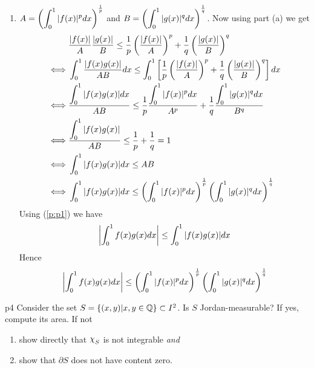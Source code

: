 \documentclass[a4paper, 11pt]{article}
\begin{document}
{\begin{enumerate}[label=(\alph*)]
\begin{align*}
	\end{align*}\Qed
	\item $A=\left(\displaystyle{\int_0^1|f(x)|^pdx}\right)^{\frac1p}$ and $B=\left(\displaystyle{\int_0^1|g(x)|^qdx}\right)^{\frac1q}$. Now using part (a) we get
	\begin{align*}
		     & \frac{|f(x)|}{A}\frac{ |g(x)| }{B}\leq \frac1p\left(\frac{ |f(x)| }{A}\right)^p+\frac1q\left(\frac{ |g(x)| }{B}\right)^q                         \\
		\iff & \int_0^1\frac{ |f(x)g(x)| }{AB}dx\leq \int_0^1\left[\frac1p\left(\frac{ |f(x)| }{A}\right)^p+\frac1q\left(\frac{ |g(x)| }{B}\right)^q\right]dx        \\
		\iff & \frac{ \displaystyle{\int_0^1|f(x)g(x)|} dx}{AB}\leq \frac1p\frac{\displaystyle{\int_0^1 |f(x)|^p dx}}{A^p}+\frac1q\frac{\displaystyle{\int_0^1 |g(x)|^qdx}}{B^q} \\
		\iff & \frac{ \displaystyle{\int_0^1|f(x)g(x)|} }{AB}\leq \frac1p+\frac1q=1                                                                            \\
		\iff & \int_0^1|f(x)g(x)|dx \leq AB                                                                                                           \\
		\iff & \int_0^1|f(x)g(x)|dx \leq  \left(\displaystyle{\int_0^1|f(x)|^pdx}\right)^{\frac1p}\left(\displaystyle{\int_0^1|g(x)|^qdx}\right)^{\frac1q}
	\end{align*}Using (\ref{p:p1}) we have $$\left|\int_0^1f(x)g(x)dx \right|\leq \int_0^1|f(x)g(x)|dx $$Hence $$\left|\int_0^1f(x)g(x)dx \right|\leq \left(\displaystyle{\int_0^1|f(x)|^pdx}\right)^{\frac1p}\left(\displaystyle{\int_0^1|g(x)|^qdx}\right)^{\frac1q}$$
	\end{enumerate}
}



\begin{problem}{%
}{p4%
}
Consider the set $S=\{(x,y)|x,y \in \mathbb{Q}\} \subset I^2$. Is $S$ Jordan-measurable? If yes, compute its area. If not \begin{enumerate}[label = (\alph*)]
	\item  show directly that $\rchi_S$ is not integrable \emph{and} \item  show that $\partial S$ does not have content zero.
\end{enumerate}
\end{problem}
\end{document}

